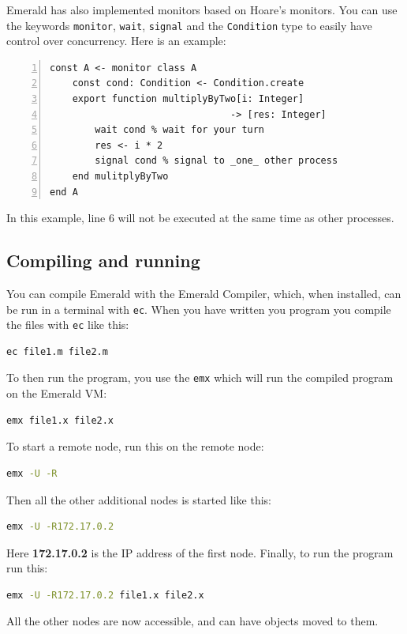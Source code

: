 Emerald has also implemented monitors based on Hoare's monitors\cite{hoare_monitors_1974}. You can use the keywords \verb|monitor|, \verb|wait|, \verb|signal| and the \verb|Condition| type to easily have control over concurrency. Here is an example:
\begin{lstlisting}[language=emerald, numbers=left]
const A <- monitor class A
    const cond: Condition <- Condition.create
    export function multiplyByTwo[i: Integer] 
                                -> [res: Integer]
        wait cond % wait for your turn
        res <- i * 2
        signal cond % signal to _one_ other process
    end mulitplyByTwo
end A
\end{lstlisting}
In this example, line 6 will not be executed at the same time as other processes.







\subsection{Compiling and running}
You can compile Emerald with the Emerald Compiler\cite{noauthor_emeraldold-emerald_2019}, which, when installed, can be run in a terminal with \verb|ec|. When you have written you program you compile the files with \verb|ec| like this:
\begin{lstlisting}[language=Bash]
ec file1.m file2.m 
\end{lstlisting}
To then run the program, you use the \verb|emx| which will run the compiled program on the Emerald VM:
\begin{lstlisting}[language=Bash]
emx file1.x file2.x
\end{lstlisting}

To start a remote node, run this on the remote node:
\begin{lstlisting}[language=Bash]
emx -U -R
\end{lstlisting}
Then all the other additional nodes is started like this:
\begin{lstlisting}[language=Bash]
emx -U -R172.17.0.2
\end{lstlisting}
Here \textbf{172.17.0.2} is the IP address of the first node.
Finally, to run the program run this:
\begin{lstlisting}[language=Bash]
emx -U -R172.17.0.2 file1.x file2.x
\end{lstlisting}
All the other nodes are now accessible, and can have objects moved to them.



